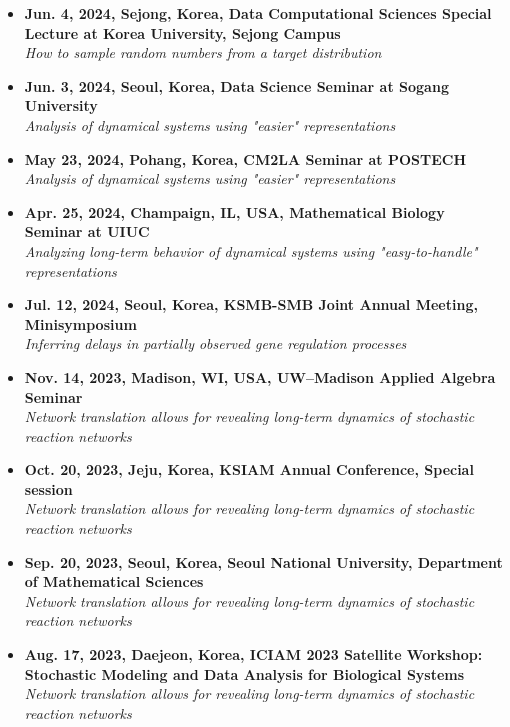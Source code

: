 \documentclass[margin,line]{res}
\begin{document}
\begin{resume}
\begin{itemize}[leftmargin=0pt, label={}]
    \textit{1. Inferring delays in partially observed gene regulation processes; 2. Density-PINNs reveal that multiple pathways reduce cell-to-cell heterogeneity in antibiotic responses}
    \item \textbf{Jun. 4, 2024, Sejong, Korea, Data Computational Sciences Special Lecture at Korea University, Sejong Campus} \\
    \textit{How to sample random numbers from a target distribution}
    \item \textbf{Jun. 3, 2024, Seoul, Korea, Data Science Seminar at Sogang University} \\
    \textit{Analysis of dynamical systems using "easier" representations}
    \item \textbf{May 23, 2024, Pohang, Korea, CM2LA Seminar at POSTECH} \\
    \textit{Analysis of dynamical systems using "easier" representations}
    \item \textbf{Apr. 25, 2024, Champaign, IL, USA, Mathematical Biology Seminar at UIUC} \\
    \textit{Analyzing long-term behavior of dynamical systems using "easy-to-handle" representations}
    \item \textbf{Jul. 12, 2024, Seoul, Korea, KSMB-SMB Joint Annual Meeting, Minisymposium} \\
    \textit{Inferring delays in partially observed gene regulation processes}
    \item \textbf{Nov. 14, 2023, Madison, WI, USA, UW–Madison Applied Algebra Seminar} \\
    \textit{Network translation allows for revealing long-term dynamics of stochastic reaction networks}
    \item \textbf{Oct. 20, 2023, Jeju, Korea, KSIAM Annual Conference, Special session} \\
    \textit{Network translation allows for revealing long-term dynamics of stochastic reaction networks}
    \item \textbf{Sep. 20, 2023, Seoul, Korea, Seoul National University, Department of Mathematical Sciences} \\
    \textit{Network translation allows for revealing long-term dynamics of stochastic reaction networks}
    \item \textbf{Aug. 17, 2023, Daejeon, Korea, ICIAM 2023 Satellite Workshop: Stochastic Modeling and Data Analysis for Biological Systems} \\
    \textit{Network translation allows for revealing long-term dynamics of stochastic reaction networks}

\end{itemize}
\end{resume}
\end{document}
